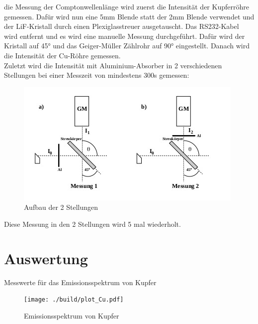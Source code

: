 \justifying die Messung der Comptonwellenlänge wird zuerst die Intensität der Kupferröhre gemessen.
Dafür wird nun eine 5mm Blende statt der 2mm Blende verwendet und der LiF-Kristall
durch einen Plexiglasstreuer ausgetauscht. Das RS232-Kabel wird entfernt und es wird
eine manuelle Messung durchgeführt. Dafür wird der Kristall auf 45° und das Geiger-Müller Zählrohr auf 90°
eingestellt. Danach wird die Intensität der Cu-Röhre gemessen.\\
Zuletzt wird die Intensität mit Aluminium-Absorber in 2 verschiedenen Stellungen bei einer Messzeit von mindestens 300s
 gemessen: \cite{V603}
\begin{figure}
    \centering
    \includegraphics[width=\linewidth]{./images/Aufbau2.jpg}
    \caption{Aufbau der 2 Stellungen}
    \label{fig:2}
\end{figure}
Diese Messung in den 2 Stellungen wird 5 mal wiederholt.


\section{Auswertung}

\begin{table}[H]
    \centering
    
    \caption{Messwerte für das Emissionsspektrum von Kupfer}
    \label{tab:1}
\end{table}


\begin{figure}[H]
    \centering
    \texttt{[image: ./build/plot\_Cu.pdf]}
    \caption{Emissionsspektrum von Kupfer}
    \label{fig:a}
\end{figure}





